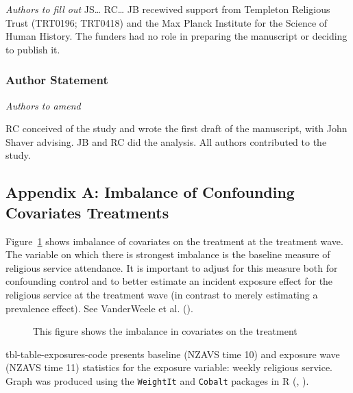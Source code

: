 \documentclass[
  single column]{article}
\begin{document}
\emph{Authors to fill out} JS\ldots{} RC\ldots{} JB recewived support
from Templeton Religious Trust (TRT0196; TRT0418) and the Max Planck
Institute for the Science of Human History. The funders had no role in
preparing the manuscript or deciding to publish it.

\subsubsection{Author Statement}\label{author-statement}

\emph{Authors to amend}

RC conceived of the study and wrote the first draft of the manuscript,
with John Shaver advising. JB and RC did the analysis. All authors
contributed to the study.

\newpage{}

\subsection{Appendix A: Imbalance of Confounding Covariates
Treatments}\label{appendix-exposures}

Figure~\ref{fig-match_1} shows imbalance of covariates on the treatment
at the treatment wave. The variable on which there is strongest
imbalance is the baseline measure of religious service attendance. It is
important to adjust for this measure both for confounding control and to
better estimate an incident exposure effect for the religious service at
the treatment wave (in contrast to merely estimating a prevalence
effect). See VanderWeele et al. ().

\begin{figure}


\caption{\label{fig-match_1}This figure shows the imbalance in
covariates on the treatment}

\end{figure}%

tbl-table-exposures-code presents baseline (NZAVS time 10) and exposure
wave (NZAVS time 11) statistics for the exposure variable: weekly
religious service. Graph was produced using the \texttt{WeightIt} and
\texttt{Cobalt} packages in R (, ).
\end{document}
